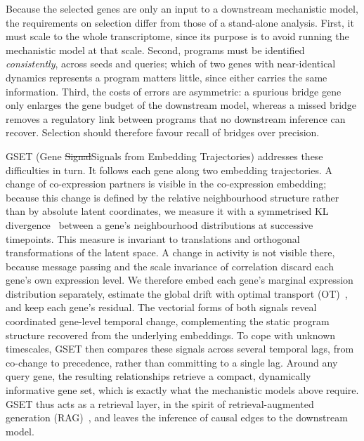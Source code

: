 \documentclass[10pt, letterpaper]{article}
\DeclareRobustCommand{\eliasadds}[1]{{\color{red}#1}}
\DeclareRobustCommand{\eliasremoves}[1]{{\color{red}\sout{#1}}}
\begin{document}
\eliasadds{Because the selected genes are only an input to a downstream mechanistic model, the requirements on selection differ from those of a stand-alone analysis. First, it must scale to the whole transcriptome, since its purpose is to avoid running the mechanistic model at that scale. Second, programs must be identified \emph{consistently}, across seeds and queries; which of two genes with near-identical dynamics represents a program matters little, since either carries the same information. Third, the costs of errors are asymmetric: a spurious bridge gene only enlarges the gene budget of the downstream model, whereas a missed bridge removes a regulatory link between programs that no downstream inference can recover. Selection should therefore favour recall of bridges over precision.}

GSET (Gene \eliasremoves{Signal}\eliasadds{Signals} from Embedding Trajectories) addresses these difficulties in turn. It follows each gene along two embedding trajectories. A change of co-expression partners is visible in the co-expression embedding; because this change is defined by the relative neighbourhood structure rather than by absolute latent coordinates, we measure it with a symmetrised KL divergence~\cite{kullback1951information} between a gene's neighbourhood distributions at successive timepoints. This measure is invariant to translations and orthogonal transformations of the latent space. A change in activity is not visible there, because message passing and the scale invariance of correlation discard each gene's own expression level. We therefore embed each gene's marginal expression distribution separately, estimate the global drift with optimal transport (OT)~\cite{courty2017optimal, schiebinger2019optimal}, and keep each gene's residual. The vectorial forms of both signals reveal coordinated gene-level temporal change, complementing the static program structure recovered from the underlying embeddings. To cope with unknown timescales, GSET then compares these signals across several temporal lags, from co-change to precedence, rather than committing to a single lag. Around any query gene, the resulting relationships retrieve a compact, dynamically informative gene set, which is exactly what the mechanistic models above require. GSET thus acts as a retrieval layer, in the spirit of retrieval-augmented generation (RAG)~\cite{lewis2020rag}, and leaves the inference of causal edges to the downstream model.
\end{document}
